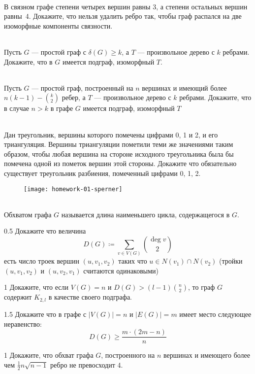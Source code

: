 \documentclass[a4paper,12pt,twoside]{article}
\begin{document}
\begin{?}[Разминочная]\ \\
    В связном графе степени четырех вершин равны 3, а степени остальных вершин равны~4. Докажите, что нельзя удалить ребро так, чтобы граф распался на две изоморфные компоненты связности.
\end{?}
\begin{?}\ \\
    Пусть $G$ --- простой граф с $\delta(G)\geq k$, а $T$ --- произвольное дерево с $k$ ребрами. Докажите, что в $G$ имеется подграф, изоморфный $T$.
\end{?}
\begin{?}\ \\
    Пусть $G$ --- простой граф, построенный на $n$ вершинах и имеющий более $n(k -1) - \binom{k}{2}$ ребер, а $T$ --- произвольное дерево с $k$ ребрами. Докажите, что в случае $n > k$ в графе $G$ имеется подграф, изоморфный $T$
\end{?}
\begin{?}\ \\ 
    Дан треугольник, вершины которого помечены цифрами 0, 1 и 2, и его триангуляция. Вершины триангуляции пометили теми же значениями таким образом, чтобы любая вершина на стороне исходного треугольника была бы помечена одной из пометок вершин этой стороны. Докажите что обязательно существует треугольник разбиения, помеченный цифрами 0, 1, 2. 
    
    \begin{figure}[h!]
        \begin{center}
            \texttt{[image: homework-01-sperner]}
        \end{center}
    \end{figure}
\end{?}
\begin{?}\ \\
    Обхватом графа $G$ называется длина наименьшего цикла, содержащегося в $G$.
    \begin{tasklist}
        \item[0.5] Докажите что величина
        \[
            D(G) \coloneqq \sum_{v \in V(G)} \binom{\deg v}{2}
        \]
        есть число троек вершин \((u, v_1, v_2)\) таких что \(u \in N(v_1) \cap N(v_2)\) (тройки \((u, v_1, v_2)\) и \((u, v_2, v_1)\) считаются одинаковыми)
        \item[1] Докажите, что если \(V(G) = n\) и
        \(
            D(G) > (l - 1) \binom{n}{2}
        \),
        то граф \(G\) содержит \(K_{2, l}\) в качестве своего подграфа.
        \item[1.5] Докажите что в графе с \(|V(G)| = n\) и \(|E(G)| = m\) имеет место следующее неравенство:
        \[
            D(G) \geq \frac{m \cdot (2m - n)}{n}
        \]
        \item[1] Докажите, что обхват графа \(G\), построенного на \(n\) вершинах и имеющего более чем \(\tfrac{1}{2}n \sqrt{n - 1}\) ребро не превосходит 4.
    \end{tasklist}
\end{?}
\end{document}
